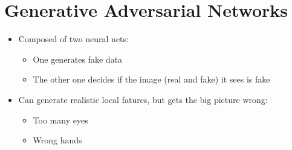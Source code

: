 \chapter{Generative Adversarial Networks}

  \begin{itemize}
    \item Composed of two neural nets:
    \begin{itemize}
      \item One generates fake data
      \item The other one decides if the image (real and fake) it sees is fake
    \end{itemize}

    \item Can generate realistic local fatures, but gets the big picture
    wrong:
    \begin{itemize}
      \item Too many eyes
      \item Wrong hands
    \end{itemize}
  \end{itemize}
